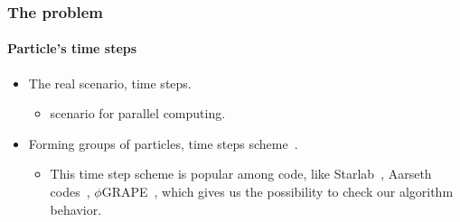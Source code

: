 \begin{frame}
    \frametitle{The {\nbody} problem}
    \framesubtitle{Particle's time steps}

    \begin{itemize}
        \item The real scenario,  time steps.
        \begin{itemize}
            \item {} scenario for parallel computing.
        \end{itemize}
        \item Forming groups of particles,  time steps scheme~\cite{Press86}.
        \begin{itemize}
            \item  This time step scheme is popular among  {\nbody} code,
                like Starlab~\cite{portegies2001, hut2003}, Aarseth {\nbody}
                codes~\cite{Aarseth99, Aarseth03,NitadoriAarseth2012},
                $\phi$GRAPE~\cite{harfst2008},
                which gives us the possibility to check our algorithm behavior.
        \end{itemize}
    \end{itemize}
\end{frame}
